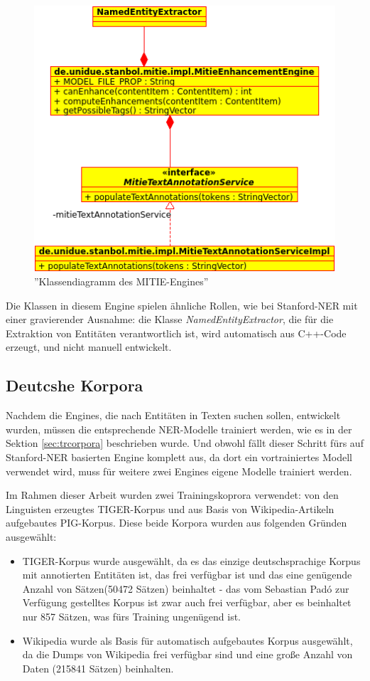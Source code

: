 \begin{figure}[ht]
\centering
\includegraphics[width=\textwidth]{Bilder/mitie-classes.png}
\caption{''Klassendiagramm  des MITIE-Engines''}
\label{fig:mitieclasses}
\end{figure}
Die Klassen in diesem Engine spielen ähnliche Rollen, wie bei Stanford-NER mit einer gravierender Ausnahme: die Klasse \textit{NamedEntityExtractor}, die für die Extraktion von Entitäten verantwortlich ist, wird automatisch aus C++-Code erzeugt, und nicht manuell entwickelt.

\subsection{Deutcshe Korpora} \label{subsec:decor}
Nachdem die Engines, die nach Entitäten in Texten suchen sollen, entwickelt wurden, müssen die entsprechende NER-Modelle trainiert werden, wie es in der Sektion \ref{sec:trcorpora} beschrieben wurde. Und obwohl fällt dieser Schritt fürs auf Stanford-NER basierten Engine komplett aus, da dort ein vortrainiertes Modell verwendet wird, muss für weitere zwei Engines eigene Modelle trainiert werden.

Im Rahmen dieser Arbeit wurden zwei Trainingskoprora verwendet: von den Linguisten erzeugtes TIGER-Korpus und aus Basis von Wikipedia-Artikeln aufgebautes PIG-Korpus. Diese beide Korpora wurden aus folgenden Gründen ausgewählt:
\begin{itemize}
\item TIGER-Korpus wurde ausgewählt, da es das einzige deutschsprachige Korpus mit annotierten Entitäten ist, das frei verfügbar ist und das eine genügende Anzahl von Sätzen(50472 Sätzen) beinhaltet - das vom Sebastian Padó\cite{faruqui10:_training} zur Verfügung gestelltes Korpus ist zwar auch frei verfügbar, aber es beinhaltet nur 857 Sätzen, was fürs Training ungenügend ist.
\item Wikipedia wurde als Basis für automatisch aufgebautes Korpus ausgewählt, da die Dumps von Wikipedia frei verfügbar sind und eine große Anzahl von Daten (215841 Sätzen) beinhalten.
\end{itemize}

